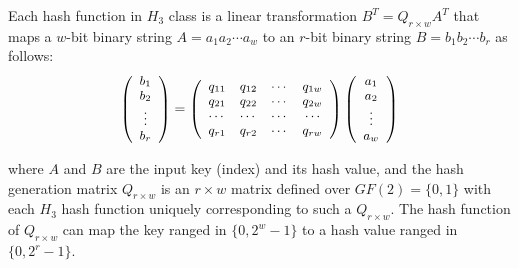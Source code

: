 \documentclass[10pt,journal,compsoc]{IEEEtran}
\begin{document}
Each hash function in $H_3$ class is a linear transformation ${B^T} = {Q_{r \times w}}{A^T}$ that maps a $w$-bit binary string $A = {a_1}{a_2} \cdots {a_w}$ to an $r$-bit binary string $B = {b_1}{b_2} \cdots {b_r}$ as follows:
\begin{equation}
\footnotesize
\left( {\begin{array}{*{20}{c}}
   {{b_1}}  \\
   {{b_2}}  \\
    \vdots   \\
   {{b_r}}  \\
\end{array}} \right) = \left( {\begin{array}{*{20}{c}}
   {{q_{11}}} & {{q_{12}}} &  \cdots  & {{q_{1w}}}  \\
   {{q_{21}}} & {{q_{22}}} &  \cdots  & {{q_{2w}}}  \\
    \cdots  &  \cdots  &  \cdots  &  \cdots   \\
   {{q_{r1}}} & {{q_{r2}}} &  \cdots  & {{q_{rw}}}  \\
\end{array}} \right)\left( {\begin{array}{*{20}{c}}
   {{a_1}}  \\
   {{a_2}}  \\
    \vdots   \\
   {{a_w}}  \\
\end{array}} \right)
\label{eq:h3hash}
\end{equation}

\noindent where $A$ and $B$ are the input key (index) and its hash value, and the hash generation matrix ${Q_{r \times w}}$ is an $r \times w$ matrix defined over $GF(2)=\{0,1\}$ with each $H_3$ hash function uniquely corresponding to such a ${Q_{r \times w}}$. The hash function of ${Q_{r \times w}}$ can map the key ranged in $\{0,{2^w} - 1\}$ to a hash value ranged in $\{0,{2^r} - 1\}$.
\end{document}
